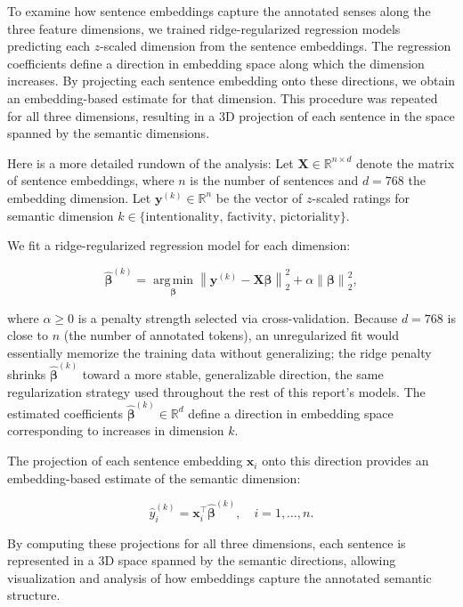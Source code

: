 \documentclass[
]{article}
\begin{document}
To examine how sentence embeddings capture the annotated senses along
the three feature dimensions, we trained ridge-regularized regression
models predicting each \(z\)-scaled dimension from the sentence
embeddings. The regression coefficients define a direction in embedding
space along which the dimension increases. By projecting each sentence
embedding onto these directions, we obtain an embedding-based estimate
for that dimension. This procedure was repeated for all three
dimensions, resulting in a 3D projection of each sentence in the space
spanned by the semantic dimensions.

Here is a more detailed rundown of the analysis: Let
\(\mathbf{X} \in \mathbb{R}^{n \times d}\) denote the matrix of sentence
embeddings, where \(n\) is the number of sentences and \(d = 768\) the
embedding dimension. Let \(\mathbf{y}^{(k)} \in \mathbb{R}^n\) be the
vector of \(z\)-scaled ratings for semantic dimension
\(k \in \{\text{intentionality, factivity, pictoriality}\}\).

We fit a ridge-regularized regression model for each dimension:

\[
\hat{\boldsymbol{\beta}}^{(k)} = \operatorname*{arg\,min}_{\boldsymbol{\beta}} \left\lVert \mathbf{y}^{(k)} - \mathbf{X}\boldsymbol{\beta} \right\rVert_2^2 + \alpha \left\lVert \boldsymbol{\beta} \right\rVert_2^2,
\]

where \(\alpha \geq 0\) is a penalty strength selected via
cross-validation. Because \(d = 768\) is close to \(n\) (the number of
annotated tokens), an unregularized fit would essentially memorize the
training data without generalizing; the ridge penalty shrinks
\(\hat{\boldsymbol{\beta}}^{(k)}\) toward a more stable, generalizable
direction, the same regularization strategy used throughout the rest of
this report's models. The estimated coefficients
\(\hat{\boldsymbol{\beta}}^{(k)} \in \mathbb{R}^d\) define a direction
in embedding space corresponding to increases in dimension \(k\).

The projection of each sentence embedding \(\mathbf{x}_i\) onto this
direction provides an embedding-based estimate of the semantic
dimension:

\[
\hat{y}^{(k)}_i = \mathbf{x}_i^\top \hat{\boldsymbol{\beta}}^{(k)}, \quad i = 1, \dots, n.
\]

By computing these projections for all three dimensions, each sentence
is represented in a 3D space spanned by the semantic directions,
allowing visualization and analysis of how embeddings capture the
annotated semantic structure.
\end{document}
